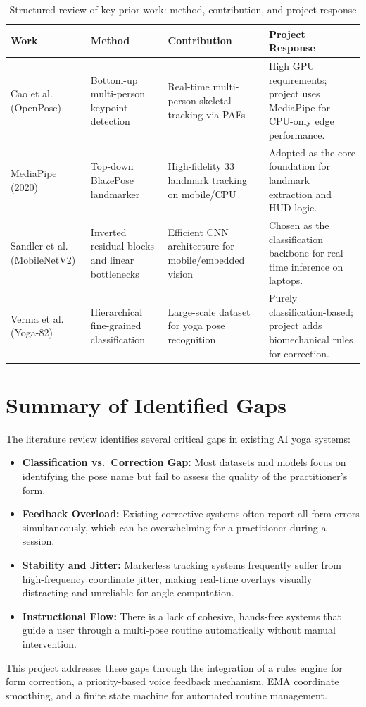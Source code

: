 \begin{table}[H]
    \centering
    \caption{Structured review of key prior work: method, contribution, and project response}
    \begin{tabular}{|p{}|p{}|p{}|p{}|}
        \hline
        \textbf{Work} & \textbf{Method} & \textbf{Contribution} & \textbf{Project Response} \\
        \hline
        Cao et al. (OpenPose) \cite{cao2017realtime} & Bottom-up multi-person keypoint detection & Real-time multi-person skeletal tracking via PAFs & High GPU requirements; project uses MediaPipe for CPU-only edge performance. \\
        \hline
        MediaPipe (2020) \cite{mediapipe2020} & Top-down BlazePose landmarker & High-fidelity 33 landmark tracking on mobile/CPU & Adopted as the core foundation for landmark extraction and HUD logic. \\
        \hline
        Sandler et al. (MobileNetV2) \cite{sandler2018mobilenetv2} & Inverted residual blocks and linear bottlenecks & Efficient CNN architecture for mobile/embedded vision & Chosen as the classification backbone for real-time inference on laptops. \\
        \hline
        Verma et al. (Yoga-82) \cite{verma2020yoga82} & Hierarchical fine-grained classification & Large-scale dataset for yoga pose recognition & Purely classification-based; project adds biomechanical rules for correction. \\
        \hline
    \end{tabular}
    \label{tab:litreview}
\end{table}

\section{Summary of Identified Gaps}
The literature review identifies several critical gaps in existing AI yoga systems:
\begin{itemize}
    \item \textbf{Classification vs.\ Correction Gap:} Most datasets and models focus on identifying the pose name but fail to assess the quality of the practitioner's form.
    \item \textbf{Feedback Overload:} Existing corrective systems often report all form errors simultaneously, which can be overwhelming for a practitioner during a session.
    \item \textbf{Stability and Jitter:} Markerless tracking systems frequently suffer from high-frequency coordinate jitter, making real-time overlays visually distracting and unreliable for angle computation.
    \item \textbf{Instructional Flow:} There is a lack of cohesive, hands-free systems that guide a user through a multi-pose routine automatically without manual intervention.
\end{itemize}
This project addresses these gaps through the integration of a rules engine for form correction, a priority-based voice feedback mechanism, EMA coordinate smoothing, and a finite state machine for automated routine management.

